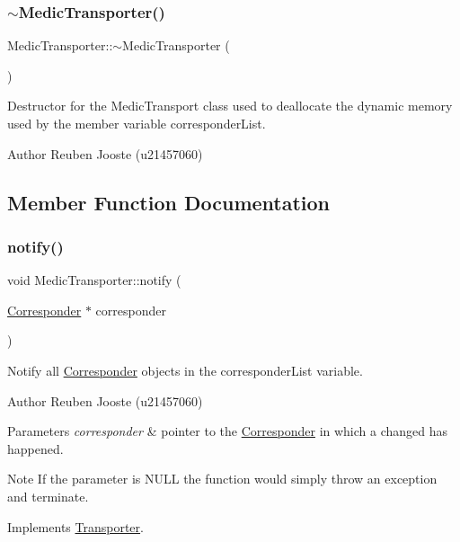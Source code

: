 \subsubsection{\texorpdfstring{$\sim$MedicTransporter()}{~MedicTransporter()}}
{\footnotesize\ttfamily Medic\+Transporter\+::$\sim$\+Medic\+Transporter (\begin{DoxyParamCaption}{ }\end{DoxyParamCaption})\hspace{0.3cm}{\ttfamily [virtual]}}



Destructor for the Medic\+Transport class used to deallocate the dynamic memory used by the member variable corresponder\+List. 

\begin{DoxyAuthor}{Author}
Reuben Jooste (u21457060) 
\end{DoxyAuthor}


\subsection{Member Function Documentation}
\mbox{\label{class_medic_transporter_ab77bbb1ad9e370c2045f1bbeb02f620b}} 
\subsubsection{\texorpdfstring{notify()}{notify()}}
{\footnotesize\ttfamily void Medic\+Transporter\+::notify (\begin{DoxyParamCaption}\item[{\mbox{\hyperlink{class_corresponder}{Corresponder}} $\ast$}]{corresponder }\end{DoxyParamCaption})\hspace{0.3cm}{\ttfamily [virtual]}}



Notify all \mbox{\hyperlink{class_corresponder}{Corresponder}} objects in the corresponder\+List variable. 

\begin{DoxyAuthor}{Author}
Reuben Jooste (u21457060) 
\end{DoxyAuthor}

\begin{DoxyParams}{Parameters}
{\em corresponder} & pointer to the \mbox{\hyperlink{class_corresponder}{Corresponder}} in which a changed has happened. \\
\hline
\end{DoxyParams}
\begin{DoxyNote}{Note}
If the parameter is N\+U\+LL the function would simply throw an exception and terminate. 
\end{DoxyNote}


Implements \mbox{\hyperlink{class_transporter_aadf5e8b8dabe203e8b184ae00847c249}{Transporter}}.

